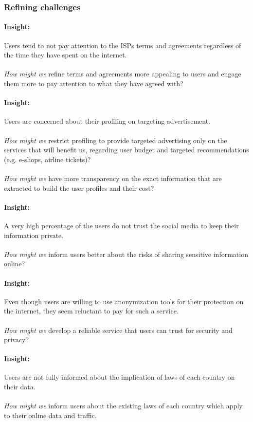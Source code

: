 \subsubsection{Refining challenges}
\label{section_4}

\paragraph{Insight: } 
Users tend to not pay attention to the ISPs terms and agreements regardless of 
the time they have spent on the internet. \\
\\\emph{How might we } 
refine terms and agreements more appealing to users and engage them more to pay 
attention to what they have agreed with?

\paragraph{Insight: }
Users are concerned about their profiling on targeting advertisement. \\
\\\emph{How might we }
restrict profiling to provide targeted advertising only on the services that 
will benefit us, regarding user budget and targeted recommendations (e.g. 
e-shops, airline tickets)?\\
\\\emph{How might we }
have more transparency on the exact information that are extracted to build the 
user profiles and their cost?

\paragraph{Insight: }
A very high percentage of the users do not trust the social media to keep their 
information private.\\
\\\emph{How might we }
inform users better about the risks of sharing sensitive information online?

\paragraph{Insight: }
Even though users are willing to use anonymization tools for their protection on 
the internet, they seem reluctant to pay for such a service.\\
\\\emph{How might we }
develop a reliable service that users can trust for security and privacy?

\paragraph{Insight: }
Users are not fully informed about the implication of laws of each country on 
their data.\\
\\\emph{How might we }
inform users about the existing laws of each country which apply to their online 
data and traffic.

